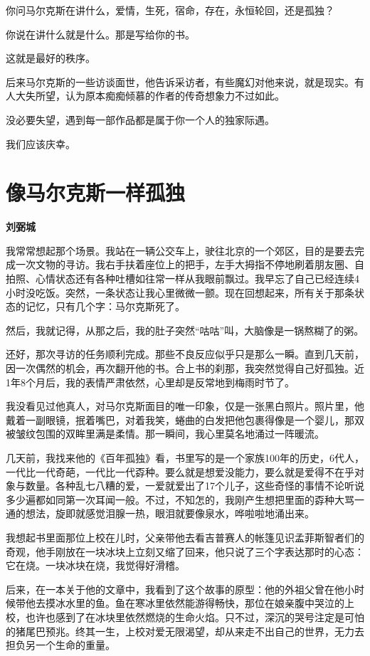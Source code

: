 \documentclass[openany,scheme = chinese, linespread = 1.5]{ctexbook}
\newcommand \name[1]{\begin{center} \kaishu \Large \bfseries #1 \end{center}}
\begin{document}
你问马尔克斯在讲什么，爱情，生死，宿命，存在，永恒轮回，还是孤独？

你说在讲什么就是什么。那是写给你的书。

这就是最好的秩序。

后来马尔克斯的一些访谈面世，他告诉采访者，有些魔幻对他来说，就是现实。有人大失所望，认为原本痴痴倾慕的作者的传奇想象力不过如此。

没必要失望，遇到每一部作品都是属于你一个人的独家际遇。

我们应该庆幸。

\newpage
\section{像马尔克斯一样孤独}
\name{刘弼城}

我常常想起那个场景。我站在一辆公交车上，驶往北京的一个郊区，目的是要去完成一次文物的寻访。我右手扶着座位上的把手，左手大拇指不停地刷着朋友圈、自拍照、心情状态还有各种吐槽如往常一样从我眼前飘过。我早忘了自己已经连续4小时没吃饭。突然，一条状态让我心里微微一颤。现在回想起来，所有关于那条状态的记忆，只有几个字：马尔克斯死了。

然后，我就记得，从那之后，我的肚子突然“咕咕”叫，大脑像是一锅熬糊了的粥。

还好，那次寻访的任务顺利完成。那些不良反应似乎只是那么一瞬。直到几天前，因一次偶然的机会，再次翻开他的书。合上书的刹那，我突然觉得自己好孤独。近1年8个月后，我的表情严肃依然，心里却是反常地到梅雨时节了。

我没看见过他真人，对马尔克斯面目的唯一印象，仅是一张黑白照片。照片里，他戴着一副眼镜，抿着嘴巴，对着我笑，蜷曲的白发把他包裹得像是一个婴儿，那双被皱纹包围的双眸里满是柔情。那一瞬间，我心里莫名地涌过一阵暖流。

几天前，我找来他的《百年孤独》看，书里写的是一个家族100年的历史，6代人，一代比一代奇葩，一代比一代孬种。要么就是想爱没能力，要么就是爱得不在乎对象与数量。各种乱七八糟的爱，一爱就爱出了17个儿子，这些奇怪的事情不论听说多少遍都如同第一次耳闻一般。不过，不知怎的，我刚产生想把里面的孬种大骂一通的想法，旋即就感觉泪腺一热，眼泪就要像泉水，哗啦啦地涌出来。

我想起书里面那位上校在儿时，父亲带他去看吉普赛人的帐篷见识孟菲斯智者们的奇观，他手刚放在一块冰块上立刻又缩了回来，他只说了三个字表达那时的心态：它在烧。一块冰块在烧，我觉得好滑稽。

后来，在一本关于他的文章中，我看到了这个故事的原型：他的外祖父曾在他小时候带他去摸冰水里的鱼。鱼在寒冰里依然能游得畅快，那位在娘亲腹中哭泣的上校，也许也感到了在冰块里依然燃烧的生命火焰。只不过，深沉的哭号注定是可怕的猪尾巴预兆。终其一生，上校对爱无限渴望，却从来走不出自己的世界，无力去担负另一个生命的重量。
\end{document}
